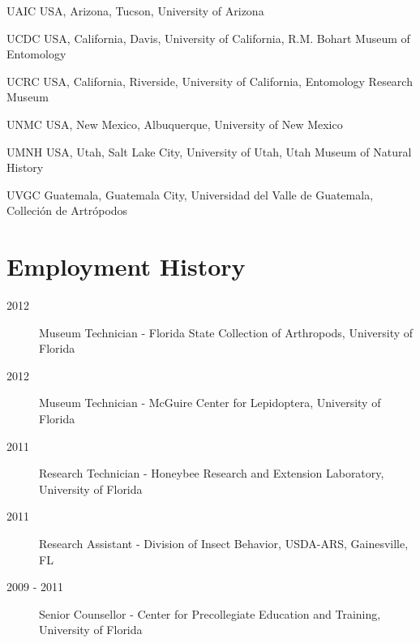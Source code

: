 \documentclass[12pt,a4paper]{article}
\begin{document}
\begin{collections}
			\item [UAIC] USA, Arizona, Tucson, University of Arizona
			\item [UCDC] USA, California, Davis, University of California, R.M. Bohart Museum of Entomology
			\item [UCRC] USA, California, Riverside, University of California, Entomology Research Museum
			\item [UNMC] USA, New Mexico, Albuquerque, University of New Mexico
			\item [UMNH] USA, Utah, Salt Lake City, University of Utah, Utah Museum of Natural History
			\item [UVGC] Guatemala, Guatemala City, Universidad del Valle de Guatemala, Colleci\'{o}n de Artr\'{o}podos
		\end{collections}

\section*{Employment History}

	\begin{description}
		\item [2012] Museum Technician - Florida State Collection of Arthropods, University of Florida
		\item [2012] Museum Technician - McGuire Center for Lepidoptera, University of Florida
		\item [2011] Research Technician - Honeybee Research and Extension Laboratory, University of Florida
		\item [2011] Research Assistant - Division of Insect Behavior, USDA-ARS, Gainesville, FL
		\item [2009 - 2011] Senior Counsellor - Center for Precollegiate Education and Training, University of Florida
	\end{description}
\end{document}
